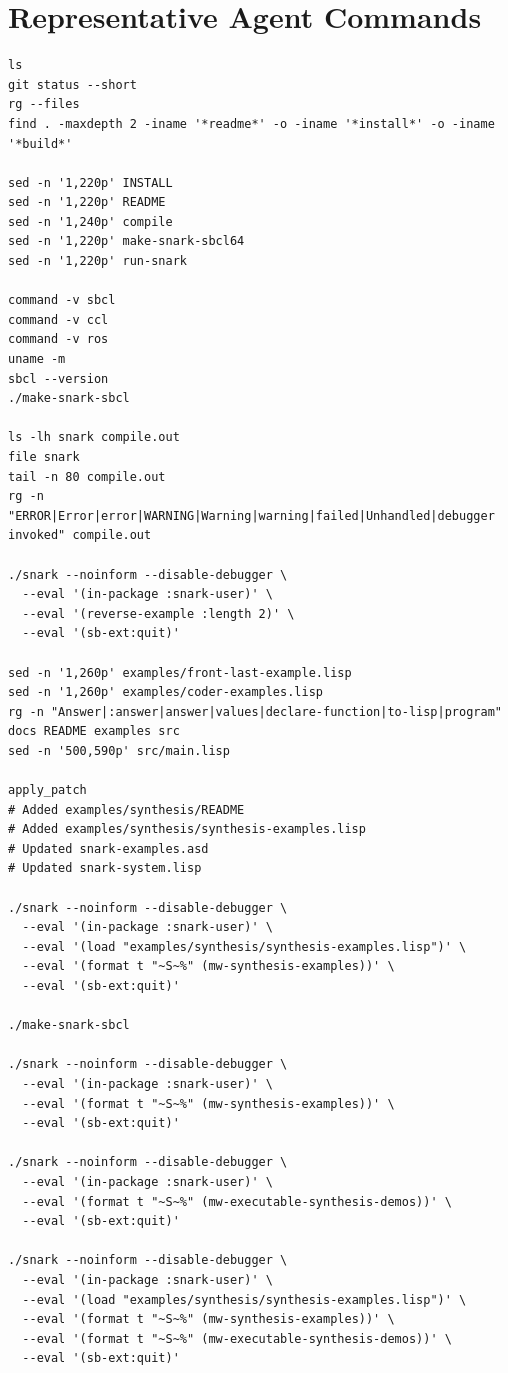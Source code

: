 \documentclass[runningheads]{llncs}
\begin{document}
\section{Representative Agent Commands}

\begin{lstlisting}
ls
git status --short
rg --files
find . -maxdepth 2 -iname '*readme*' -o -iname '*install*' -o -iname '*build*'

sed -n '1,220p' INSTALL
sed -n '1,220p' README
sed -n '1,240p' compile
sed -n '1,220p' make-snark-sbcl64
sed -n '1,220p' run-snark

command -v sbcl
command -v ccl
command -v ros
uname -m
sbcl --version
./make-snark-sbcl

ls -lh snark compile.out
file snark
tail -n 80 compile.out
rg -n "ERROR|Error|error|WARNING|Warning|warning|failed|Unhandled|debugger invoked" compile.out

./snark --noinform --disable-debugger \
  --eval '(in-package :snark-user)' \
  --eval '(reverse-example :length 2)' \
  --eval '(sb-ext:quit)'

sed -n '1,260p' examples/front-last-example.lisp
sed -n '1,260p' examples/coder-examples.lisp
rg -n "Answer|:answer|answer|values|declare-function|to-lisp|program" docs README examples src
sed -n '500,590p' src/main.lisp

apply_patch
# Added examples/synthesis/README
# Added examples/synthesis/synthesis-examples.lisp
# Updated snark-examples.asd
# Updated snark-system.lisp

./snark --noinform --disable-debugger \
  --eval '(in-package :snark-user)' \
  --eval '(load "examples/synthesis/synthesis-examples.lisp")' \
  --eval '(format t "~S~%" (mw-synthesis-examples))' \
  --eval '(sb-ext:quit)'

./make-snark-sbcl

./snark --noinform --disable-debugger \
  --eval '(in-package :snark-user)' \
  --eval '(format t "~S~%" (mw-synthesis-examples))' \
  --eval '(sb-ext:quit)'

./snark --noinform --disable-debugger \
  --eval '(in-package :snark-user)' \
  --eval '(format t "~S~%" (mw-executable-synthesis-demos))' \
  --eval '(sb-ext:quit)'

./snark --noinform --disable-debugger \
  --eval '(in-package :snark-user)' \
  --eval '(load "examples/synthesis/synthesis-examples.lisp")' \
  --eval '(format t "~S~%" (mw-synthesis-examples))' \
  --eval '(format t "~S~%" (mw-executable-synthesis-demos))' \
  --eval '(sb-ext:quit)'


\end{lstlisting}
\end{document}

